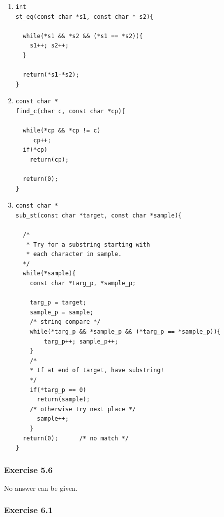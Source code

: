    \begin{enumerate}

    \item 
     \begin{Verbatim}
int
st_eq(const char *s1, const char * s2){

  while(*s1 && *s2 && (*s1 == *s2)){
    s1++; s2++;
  }

  return(*s1-*s2);
}
\end{Verbatim}

    

    \item 
     \begin{Verbatim}
const char *
find_c(char c, const char *cp){

  while(*cp && *cp != c)
     cp++;
  if(*cp)
    return(cp);

  return(0);
}
\end{Verbatim}

    

    \item 
     \begin{Verbatim}
const char *
sub_st(const char *target, const char *sample){

  /*
   * Try for a substring starting with
   * each character in sample.
  */
  while(*sample){
    const char *targ_p, *sample_p;

    targ_p = target;
    sample_p = sample;
    /* string compare */
    while(*targ_p && *sample_p && (*targ_p == *sample_p)){
        targ_p++; sample_p++;
    }
    /*
    * If at end of target, have substring!
    */
    if(*targ_p == 0)
      return(sample);
    /* otherwise try next place */
      sample++;
    }
  return(0);      /* no match */
}
\end{Verbatim}

    

   \end{enumerate}

  

  \subsubsection*{Exercise 5.6}

   No answer can be given.


  

 

  

  \subsubsection*{Exercise 6.1}

